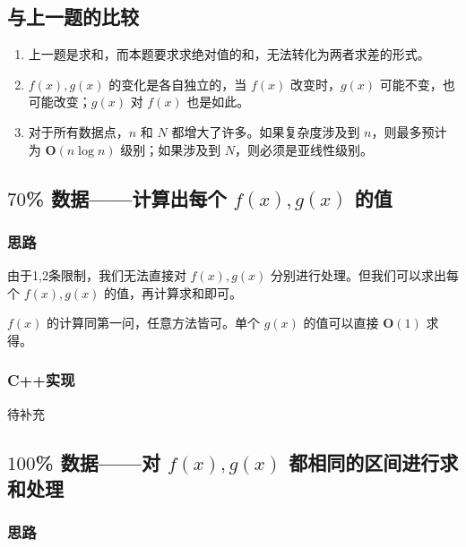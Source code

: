 
% 

\subsection{与上一题的比较}

\begin{enumerate}
    \item 上一题是求和，而本题要求求绝对值的和，无法转化为两者求差的形式。
    \item $f(x),g(x)$ 的变化是各自独立的，当 $f(x)$ 改变时，$g(x)$ 可能不变，也可能改变；$g(x)$ 对 $f(x)$ 也是如此。
    \item 对于所有数据点，$n$ 和 $N$ 都增大了许多。如果复杂度涉及到 $n$，则最多预计为 $\mathbf{O}(n\log n)$ 级别；如果涉及到 $N$，则必须是亚线性级别。
\end{enumerate}

\subsection{$70$\% 数据——计算出每个 $f(x),g(x)$ 的值}

\subsubsection{思路}

由于1,2条限制，我们无法直接对 $f(x),g(x)$ 分别进行处理。但我们可以求出每个 $f(x),g(x)$ 的值，再计算求和即可。

$f(x)$ 的计算同第一问，任意方法皆可。单个 $g(x)$ 的值可以直接 $\mathbf{O}(1)$ 求得。

\subsubsection{C++实现}

待补充

\subsection{$100$\% 数据——对 $f(x),g(x)$ 都相同的区间进行求和处理}

\subsubsection{思路}

